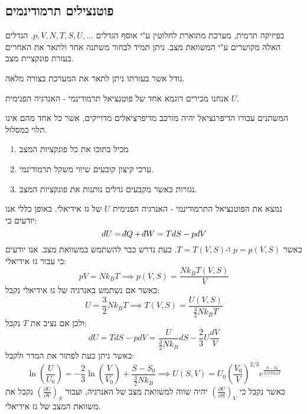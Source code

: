 \documentclass{tstextbook}
\begin{document}
\subsection{פוטנצילים תרמודינמים}

בפיזיקה תרמית, מערכת מתוארת לחלוטין ע"י אוסף הגדלים \(p,V,N,T,S,U, \dots\). הגדלים האלה מקושרים ע"י המשוואת מצב. ניתן תמיד לבחור משתנה אחד ולתאר את האחרים בעזרת פונקציית מצב.

\begin{definition}
גודל אשר בעזרתו ניתן לתאר את המערכת בצורה מלאה.

\end{definition}
אנחנו מכירים דוגמא אחד של פוטנציאל תרמודינמי - האנרגיה הפנימית \(U\).

\begin{definition}
המשתנים עבורו הדיפרנציאל יהיה מורכב מדיפרציאלים מדוייקים, אשר כל אחד מהם אינו תלוי במסלול.

\end{definition}
\begin{proposition}
  \begin{enumerate}
    \item מכיל בתוכו את כל פונקציות המצב 


    \item ערכי קיצון קובעים שיווי משקל תרמודינמי. 


    \item נגזרות כאשר מקבעים גדלים נותנות את פונקציות המצב. 


  \end{enumerate}
\end{proposition}
\begin{example}
נמצא את הפוטנציאל התרמודינמי - האנרגיה הפנימית \(U\) של גז אידיאלי. באופן כללי אנו יודעים כי:
$$dU=\;\bar{}\mkern-7.5mu dQ+\;\bar{}\mkern-7.5mu dW =TdS - pdV$$
כאשר \(p=p(V,S)\) ו-\(T=T(V,S)\). כעת נדרש כבר להשתמש במשוואת מצב. אנו יודעים כי עבור גז אידיאלי:
$$pV=Nk_{B}T \implies p(V,S)= \frac{Nk_{B}T(V,S)}{V}$$
כאשר אם נשתמש באנרגיה של גז אידיאלי נקבל:
$$U=\frac{3}{2}Nk_{B}T\implies T(V,S)= \frac{U(V,S)}{\frac{3}{2}Nk_{B}T}$$
ולכן אם נציב את \(T\) נקבל:
$$dU= TdS-pdV=\frac{U}{\frac{3}{2}Nk_{B}}dS - \frac{2}{3}U \frac{dV}{V}$$
כאשר ניתן כעת לפתור את המדר ולקבל:
$$\ln \left( \frac{U}{U_{0}} \right)=-\frac{2}{3}\ln\left( \frac{V}{V_{0}} \right)+\frac{S-S_{0}}{\frac{3}{2}Nk_{B}} \implies U(S,V)=U_{0}\left( \frac{V_{0}}{V} \right)^{2/3} e^{ \frac{S-S_{0}}{3/2 Nk_{B}T} }$$
כאשר נקבל כי \(\left( \frac{\partial U}{\partial S} \right)_{V}\) יהיה שווה למשוואת מצב של האנרגיה, ועבור \(\left( \frac{\partial U}{\partial V} \right)_{S}\) נקבל את משוואת המצב של גז אידיאלי.

\end{example}
\end{document}

